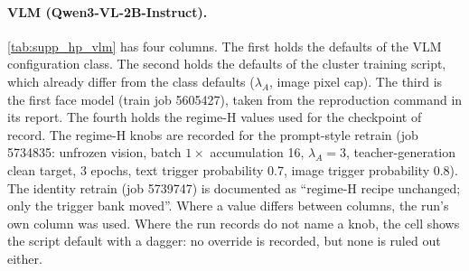 \paragraph{VLM (Qwen3-VL-2B-Instruct).}
\cref{tab:supp_hp_vlm} has four columns. The first holds the defaults of the
VLM configuration class. The second holds the defaults of the cluster training
script, which already differ from the class defaults ($\lambda_A$, image pixel
cap). The third is the first face model (train job 5605427), taken from the
reproduction command in its report. The fourth holds the regime-H values used
for the checkpoint of record.
The regime-H knobs are recorded for the prompt-style retrain (job 5734835:
unfrozen vision, batch $1\times$ accumulation 16, $\lambda_A=3$,
teacher-generation clean target, 3 epochs, text trigger probability 0.7, image
trigger probability 0.8). The identity retrain (job 5739747) is documented as
``regime-H recipe unchanged; only the trigger bank moved''. Where a value differs
between columns, the run's own column was used. Where the run records do not name a
knob, the cell shows the script default with a dagger: no override is recorded,
but none is ruled out either.

